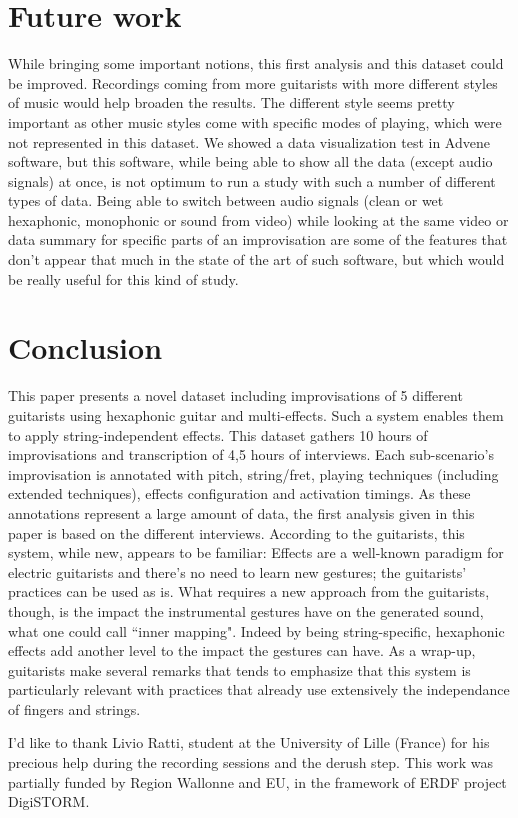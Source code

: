 \documentclass{article}
\begin{document}
\section{Future work}\label{sec:future_work}

While bringing some important notions, this first analysis and this dataset could be improved. Recordings coming from more guitarists with more different styles of music would help broaden the results.  The different style seems pretty important as other music styles come with specific modes of playing, which were not represented in this dataset.
We showed a data visualization test in Advene software, but this software, while being able to show all the data (except audio signals) at once, is not optimum to run a study with such a number of different types of data.  Being able to switch between audio signals (clean or wet hexaphonic, monophonic or sound from video) while looking at the same video or data summary for specific parts of an improvisation are some of the features that don't appear that much in the state of the art of such software, but which would be really useful for this kind of study.

\section{Conclusion}\label{sec:conclusion}
This paper presents a novel dataset including improvisations of 5 different guitarists using hexaphonic guitar and multi-effects. Such a system enables them to apply string-independent effects. This dataset gathers 10 hours of improvisations and transcription of 4,5 hours of interviews. 
Each sub-scenario's improvisation is annotated with pitch, string/fret, playing techniques (including extended techniques), effects configuration and activation timings. As these annotations represent a large amount of data, the first analysis given in this paper is based on the different interviews. According to the guitarists, this system, while new, appears to be familiar: Effects are a well-known paradigm for electric guitarists and there's no need to learn new gestures; the guitarists' practices can be used as is. What requires a new approach from the guitarists, though, is the impact the instrumental gestures have on the generated sound, what one could call ``inner mapping".  Indeed by being string-specific, hexaphonic effects add another level to the impact the gestures can have.
As a wrap-up, guitarists make several remarks that tends to emphasize that this system is particularly relevant with practices that already use extensively the independance of fingers and strings.



\begin{acknowledgments}
I'd like to thank Livio Ratti, student at the University of Lille (France) for his precious help during the recording sessions and the derush step. This work was partially funded by Region Wallonne and EU, in the framework of ERDF project DigiSTORM.
\end{acknowledgments} 


\end{document}
